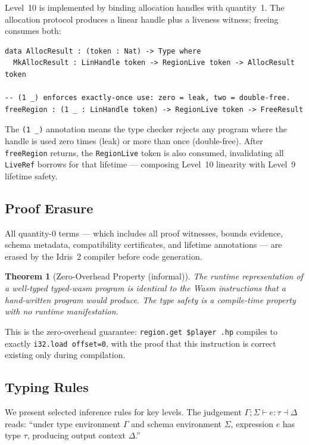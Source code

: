 \documentclass[sigplan,nonacm,screen]{acmart}
\newtheorem{theorem}{Theorem}
\begin{document}
Level~10 is implemented by binding allocation handles with quantity~1.
The allocation protocol produces a linear handle plus a liveness witness;
freeing consumes both:

\begin{lstlisting}[language=Idris2,caption={Linear resource protocol: alloc produces, free consumes.}]
data AllocResult : (token : Nat) -> Type where
  MkAllocResult : LinHandle token -> RegionLive token -> AllocResult token

-- (1 _) enforces exactly-once use: zero = leak, two = double-free.
freeRegion : (1 _ : LinHandle token) -> RegionLive token -> FreeResult
\end{lstlisting}

The \texttt{(1 \_)} annotation means the type checker rejects any program
where the handle is used zero times (leak) or more than once (double-free).
After \texttt{freeRegion} returns, the \texttt{RegionLive} token is also
consumed, invalidating all \texttt{LiveRef} borrows for that lifetime ---
composing Level~10 linearity with Level~9 lifetime safety.

\subsection{Proof Erasure}

All quantity-0 terms --- which includes all proof witnesses, bounds
evidence, schema metadata, compatibility certificates, and lifetime
annotations --- are erased by the Idris~2 compiler before code generation.

\begin{theorem}[Zero-Overhead Property (informal)]
The runtime representation of a well-typed typed-wasm program is identical
to the Wasm instructions that a hand-written program would produce. The
type safety is a compile-time property with no runtime manifestation.
\end{theorem}

This is the zero-overhead guarantee: \texttt{region.get \$player .hp}
compiles to exactly \texttt{i32.load offset=0}, with the proof that this
instruction is correct existing only during compilation.

\subsection{Typing Rules}

We present selected inference rules for key levels. The judgement
$\Gamma; \Sigma \vdash e : \tau \dashv \Delta$ reads: ``under type
environment $\Gamma$ and schema environment $\Sigma$, expression $e$
has type $\tau$, producing output context $\Delta$.''
\end{document}
